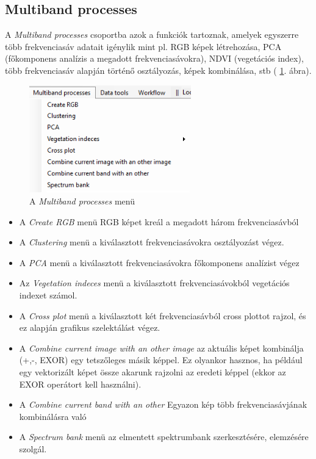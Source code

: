 \documentclass[a4paper,12pt]{book}
\begin{document}
	 
\subsection{Multiband processes}

A\textit{ Multiband processes} csoportba azok a funkciók tartoznak, amelyek egyszerre több frekvenciasáv adatait igénylik mint pl. RGB képek létrehozása, PCA (főkomponens analízis a megadott frekvenciasávokra), NDVI (vegetációs index), több frekvenciasáv alapján történő osztályozás, képek kombinálása, stb ( \ref{fig:multiband_menu}. ábra). 


	\begin{figure}
	\centering
	\includegraphics[width=7cm]{multiband_menu.png}
	\caption{A \textit{Multiband processes} menü}
	\label{fig:multiband_menu}
	\end{figure}


\begin{itemize}
	
	\item A \textit{Create RGB} menü RGB képet kreál a megadott három frekvenciasávból
	
	
	\item A \textit{Clustering} menü a kiválasztott frekvenciasávokra osztályozást végez.
	
	\item A \textit{PCA} menü a kiválasztott frekvenciasávokra főkomponens analízist végez
	
	\item Az \textit{Vegetation indeces} menü a kiválasztott frekvenciasávokból vegetációs indexet számol.
	
	\item A \textit{Cross plot} menü a kiválasztott két frekvenciasávból cross plottot rajzol, és ez alapján grafikus szelektálást végez.
	
	\item A \textit{Combine current image with an other image} az aktuális képet kombinálja (+,-, EXOR) egy tetszőleges másik képpel. Ez olyankor hasznos, ha például egy vektorizált képet össze akarunk rajzolni az eredeti képpel (ekkor az EXOR operátort kell használni).
	
	\item A \textit{Combine current band with an other} Egyazon kép több frekvenciasávjának kombinálásra való
	
	\item A \textit{Spectrum bank} menü az elmentett spektrumbank szerkesztésére, elemzésére szolgál.
	

\end{itemize}
\end{document}
